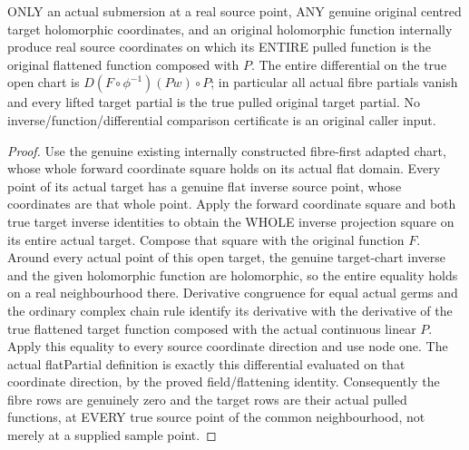 \begin{lemma}
\label{hir:submersion-relative-differential-actual-inverse-chain-rule}
\leanok
ONLY an actual submersion at a real source point, ANY genuine original centred
target holomorphic coordinates, and an original holomorphic function internally
produce real source coordinates on which its ENTIRE pulled function is the
original flattened function composed with $P$. The entire differential on the
true open chart is $D(F\circ\phi^{-1})(Pw)\circ P$; in particular all actual
fibre partials vanish and every lifted target partial is the true pulled
original target partial. No inverse/function/differential comparison
certificate is an original caller input.
\end{lemma}
\begin{proof}
Use the genuine existing internally constructed fibre-first adapted chart,
whose whole forward coordinate square holds on its actual flat domain.
Every point of its actual target has a genuine flat inverse source point,
whose coordinates are that whole point. Apply the forward coordinate square
and both true target inverse identities to obtain the WHOLE inverse projection
square on its entire actual target. Compose that square with the
original function $F$. Around every actual point of this open target, the
genuine target-chart inverse and the given holomorphic function are
holomorphic, so the entire equality holds on a real neighbourhood there.
Derivative congruence for equal actual germs and the ordinary complex chain
rule identify its derivative with the derivative of the true flattened target
function composed with the actual continuous linear $P$. Apply this equality
to every source coordinate direction and use node one. The actual
flatPartial definition is exactly this differential evaluated on that
coordinate direction, by the proved field/flattening identity. Consequently
the fibre rows are genuinely zero and the target rows are their actual pulled
functions, at EVERY true source point of the common neighbourhood, not merely
at a supplied sample point.
\end{proof}


